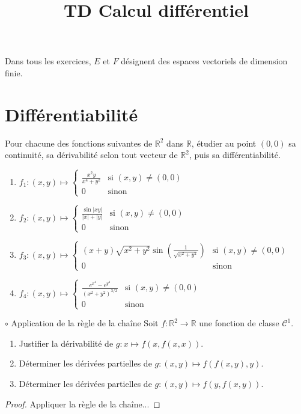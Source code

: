 \documentclass[french,a4paper]{article}
\title{TD Calcul différentiel}
\newcommand{\R}{\mathbb{R}}
\theoremstyle{plain}
\theoremstyle{definition}
\theoremstyle{remark}
\begin{document}
\maketitle

Dans tous les exercices, $E$ et $F$ désignent des espaces vectoriels de dimension finie.

\section{Différentiabilité}

\begin{ex}[Moulin.CD.01]{}
	Pour chacune des fonctions suivantes de $\R^2$ dans $\R$, étudier au point $(0,0)$ sa continuité, sa dérivabilité selon tout vecteur de $\R^2$, puis sa différentiabilité.
	\begin{enumerate}
		\item $\displaystyle f_1:(x,y)\mapsto\begin{cases}
			\displaystyle\frac{x^2y}{x^4+y^2}&\text{si }(x,y)\ne(0,0)\\
			0&\text{sinon}
		\end{cases}$
		\item $\displaystyle f_2:(x,y)\mapsto\begin{cases}
			\displaystyle\frac{\sin\lvert xy\rvert}{\lvert x\rvert+\lvert y\rvert}&\text{si }(x,y)\ne(0,0)\\
			0&\text{sinon}
		\end{cases}$
		\item $\displaystyle f_3:(x,y)\mapsto\begin{cases}
			\displaystyle(x+y)\sqrt{x^2+y^2}\sin\left(\frac{1}{\sqrt{x^2+y^2}}\right)&\text{si }(x,y)\ne(0,0)\\
			0&\text{sinon}
		\end{cases}$
		\item $\displaystyle f_4:(x,y)\mapsto\begin{cases}
			\displaystyle\frac{e^{x^4}-e^{y^4}}{(x^2+y^2)^{3/2}}&\text{si }(x,y)\ne(0,0)\\
			0&\text{sinon}
		\end{cases}$
	\end{enumerate}
\end{ex}

\begin{ex}[Moulin.CD.02]{$\circ$ Application de la règle de la chaîne}
	Soit $f:\R^2\to\R$ une fonction de classe $\mathcal{C}^1$.
	\begin{enumerate}
		\item Justifier la dérivabilité de $g:x\mapsto f(x,f(x,x))$.
		\item Déterminer les dérivées partielles de $g:(x,y)\mapsto f(f(x,y),y)$.
		\item Déterminer les dérivées partielles de $g:(x,y)\mapsto f(y,f(x,y))$.
	\end{enumerate}
\end{ex}
\begin{proof}
	Appliquer la règle de la chaîne...
\end{proof}
\end{document}
